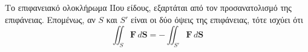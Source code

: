 \begin{rem}
  Το επιφανειακό ολοκλήρωμα ΙΙου είδους, εξαρτάται από τον προσανατολισμό της επιφάνειας.
  Επομένως, αν $S$ και $ S' $ είναι οι δύο όψεις της επιφάνειας, τότε ισχύει ότι 
  \[
    \iint_{S} \mathbf{F} \,{d \mathbf{S}} = - \iint_{S'} \mathbf{F} \,{d \mathbf{S}} 
   \] 
\end{rem}
  

